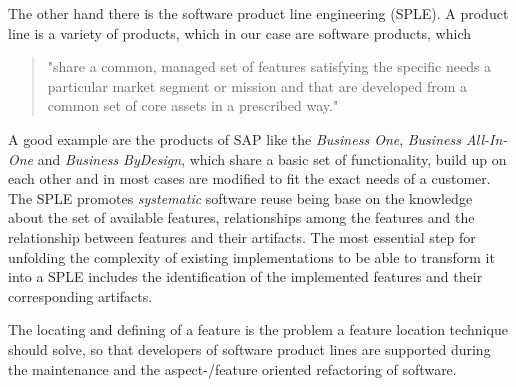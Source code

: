 The other hand there is the software product line engineering (SPLE). A product line is a variety of products, which in our case are software products, which 
\begin{quote}
	"share a common, managed set of features satisfying the specific needs a particular market segment or mission and that are developed from a common set of core assets in a prescribed way." \cite{SPL}
\end{quote}
A good example are the products of  SAP like the \emph{Business One}, \emph{Business All-In-One} and \emph{Business ByDesign}, which share a basic set of functionality, build up on each other and in most cases are modified to fit the exact needs of a customer.
The SPLE promotes \textit{systematic}  software reuse being base on the knowledge about the set of available features, relationships among the features and the relationship between features and their artifacts.
The most essential step for unfolding the complexity of existing implementations to be able to transform it into a SPLE includes the identification of the implemented features and their corresponding artifacts.

The locating and defining of a feature is the problem a feature location technique should solve, so that developers of software product lines are supported during the maintenance and the aspect-/feature oriented refactoring of software. 

